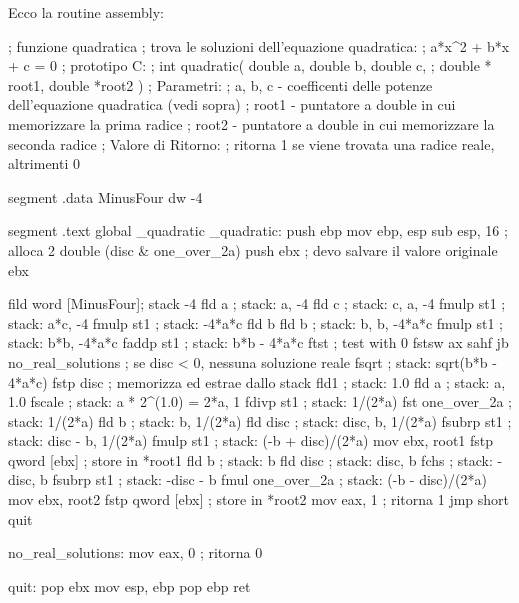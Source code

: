 Ecco la routine assembly:
\begin{AsmCodeListing}[label=quad.asm,commentchar=\$]
; funzione quadratica
; trova le soluzioni dell'equazione quadratica: 
;       a*x^2 + b*x + c = 0
; prototipo C:
;   int quadratic( double a, double b, double c,
;                  double * root1, double *root2 )
; Parametri:
;   a, b, c - coefficenti delle potenze dell'equazione quadratica (vedi sopra)
;   root1   - puntatore a double in cui memorizzare la prima radice
;   root2   - puntatore a double in cui memorizzare la seconda radice
; Valore di Ritorno:
;   ritorna 1 se viene trovata una radice reale, altrimenti 0


segment .data
MinusFour       dw      -4

segment .text
        global  _quadratic
_quadratic:
        push    ebp
        mov     ebp, esp
        sub     esp, 16         ; alloca 2 double (disc & one_over_2a)
        push    ebx             ; devo salvare il valore originale ebx

        fild    word [MinusFour]; stack -4
        fld     a               ; stack: a, -4
        fld     c               ; stack: c, a, -4
        fmulp   st1             ; stack: a*c, -4
        fmulp   st1             ; stack: -4*a*c
        fld     b
        fld     b               ; stack: b, b, -4*a*c
        fmulp   st1             ; stack: b*b, -4*a*c
        faddp   st1             ; stack: b*b - 4*a*c
        ftst                    ; test with 0
        fstsw   ax
        sahf
        jb      no_real_solutions ; se disc < 0, nessuna soluzione reale
        fsqrt                   ; stack: sqrt(b*b - 4*a*c)
        fstp    disc            ; memorizza ed estrae dallo stack
        fld1                    ; stack: 1.0
        fld     a               ; stack: a, 1.0
        fscale                  ; stack: a * 2^(1.0) = 2*a, 1
        fdivp   st1             ; stack: 1/(2*a)
        fst     one_over_2a     ; stack: 1/(2*a)
        fld     b               ; stack: b, 1/(2*a)
        fld     disc            ; stack: disc, b, 1/(2*a)
        fsubrp  st1             ; stack: disc - b, 1/(2*a)
        fmulp   st1             ; stack: (-b + disc)/(2*a)
        mov     ebx, root1
        fstp    qword [ebx]     ; store in *root1
        fld     b               ; stack: b
        fld     disc            ; stack: disc, b
        fchs                    ; stack: -disc, b
        fsubrp  st1             ; stack: -disc - b
        fmul    one_over_2a     ; stack: (-b - disc)/(2*a)
        mov     ebx, root2
        fstp    qword [ebx]     ; store in *root2
        mov     eax, 1          ; ritorna 1
        jmp     short quit

no_real_solutions:
        mov     eax, 0          ; ritorna 0

quit:
        pop     ebx
        mov     esp, ebp
        pop     ebp
        ret
\end{AsmCodeListing}

